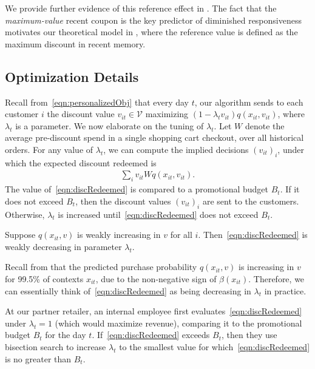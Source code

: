 \documentclass[format=acmsmall, review=false]{acmart}
\newcommand{\cV}{\mathcal{V}}
\begin{document}
We provide further evidence of this reference effect in .
The fact that the \emph{maximum-value} recent coupon is the key predictor of diminished responsiveness motivates our theoretical model in  , where the reference value is defined as the maximum discount in recent memory.

\subsection{Optimization Details}

Recall from~\eqref{eqn:personalizedObj} that every day $t$, our algorithm sends to each customer $i$ the discount value $v_{it}\in\cV$ maximizing $(1-\lambda_t v_{it})q(x_{it},v_{it})$, where $\lambda_t$ is a parameter.  We now elaborate on the tuning of $\lambda_t$.  Let $W$ denote the average pre-discount spend in a single shopping cart checkout, over all historical orders.
For any value of $\lambda_t$, we can compute the implied decisions $(v_{it})_i$, under which the expected discount redeemed is
\begin{align} \label{eqn:discRedeemed}
\sum_i v_{it} W q(x_{it},v_{it}).
\end{align}
The value of~\eqref{eqn:discRedeemed} is compared to a promotional budget $B_t$.  If it does not exceed $B_t$, then the discount values $(v_{it})_i$ are sent to the customers.  Otherwise, $\lambda_t$ is increased until~\eqref{eqn:discRedeemed} does not exceed $B_t$.

\begin{proposition} \label{prop:simple}
Suppose $q(x_{it},v)$ is weakly increasing in $v$ for all $i$.  Then~\eqref{eqn:discRedeemed} is weakly decreasing in parameter $\lambda_t$.
\end{proposition}

Recall from  that the 
predicted purchase probability $q(x_{it},v)$ is increasing in $v$ for 99.5\% of contexts $x_{it}$, due to the non-negative sign of $\beta(x_{it})$.
Therefore, we can essentially think of~\eqref{eqn:discRedeemed} as being decreasing in $\lambda_t$ in practice.

At our partner retailer, an internal employee first evaluates~\eqref{eqn:discRedeemed} under $\lambda_t=1$ (which would maximize revenue), comparing it to the promotional budget $B_t$ for the day $t$.  If~\eqref{eqn:discRedeemed} exceeds $B_t$, then they use bisection search to increase $\lambda_t$ to the smallest value for which~\eqref{eqn:discRedeemed} is no greater than $B_t$.
\end{document}
